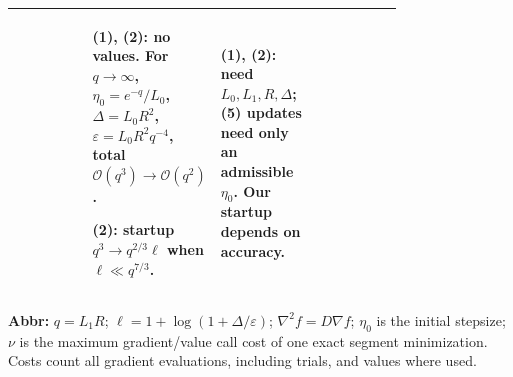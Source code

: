 \begin{table}[tp]
\begin{threeparttable}
\begin{tabularx}{\linewidth}{@{}>{\raggedright\arraybackslash}p{0.20\linewidth}>{\raggedright\arraybackslash}p{0.32\linewidth}>{\raggedright\arraybackslash}p{0.25\linewidth}>{\raggedright\arraybackslash}X@{}}
& \textbf{(1)}, \textbf{(2)}: no values. For $q\to\infty$, $\eta_0=e^{-q}/L_0$, $\Delta=L_0R^2$, $\varepsilon=L_0R^2q^{-4}$, total $\mathcal{O}(q^3)\to\mathcal{O}(q^2)$.\par \textbf{(2)}: startup $q^3\to q^{2/3}\ell$ when $\ell\ll q^{7/3}$.
& \textbf{(1)}, \textbf{(2)}: need $L_0,L_1,R,\Delta$; \textbf{(5)} updates need only an admissible $\eta_0$. Our startup depends on accuracy. \\
\bottomrule
\end{tabularx}
\begin{tablenotes}[flushleft]\footnotesize
\item[] \textbf{Abbr:} $q=L_1R$; $\ell=1+\log(1+\Delta/\varepsilon)$; $\nabla^2 f=D\nabla f$; $\eta_0$ is the initial stepsize; $\nu$ is the maximum gradient/value call cost of one exact segment minimization. Costs count all gradient evaluations, including trials, and values where used.
\end{tablenotes}
\end{threeparttable}
\end{table}
\clearpage
